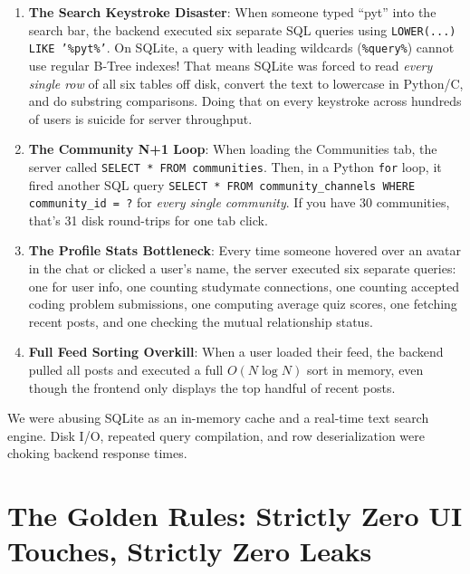 \documentclass[11pt,a4paper]{article}
\begin{document}
\begin{enumerate}
    \item \textbf{The Search Keystroke Disaster}: When someone typed ``pyt'' into the search bar, the backend executed six separate SQL queries using \texttt{LOWER(...) LIKE '\%pyt\%'}. On SQLite, a query with leading wildcards (\texttt{\%query\%}) cannot use regular B-Tree indexes! That means SQLite was forced to read \textit{every single row} of all six tables off disk, convert the text to lowercase in Python/C, and do substring comparisons. Doing that on every keystroke across hundreds of users is suicide for server throughput.
    
    \item \textbf{The Community N+1 Loop}: When loading the Communities tab, the server called \texttt{SELECT * FROM communities}. Then, in a Python \texttt{for} loop, it fired another SQL query \texttt{SELECT * FROM community_channels WHERE community_id = ?} for \textit{every single community}. If you have 30 communities, that's 31 disk round-trips for one tab click.
    
    \item \textbf{The Profile Stats Bottleneck}: Every time someone hovered over an avatar in the chat or clicked a user's name, the server executed six separate queries: one for user info, one counting studymate connections, one counting accepted coding problem submissions, one computing average quiz scores, one fetching recent posts, and one checking the mutual relationship status.
    
    \item \textbf{Full Feed Sorting Overkill}: When a user loaded their feed, the backend pulled all posts and executed a full $O(N \log N)$ sort in memory, even though the frontend only displays the top handful of recent posts.
\end{enumerate}

\begin{tcolorbox}[colback=red!5!white,colframe=red!75!black,title=\textbf{The Bottom Line}]
We were abusing SQLite as an in-memory cache and a real-time text search engine. Disk I/O, repeated query compilation, and row deserialization were choking backend response times.
\end{tcolorbox}

\section{The Golden Rules: Strictly Zero UI Touches, Strictly Zero Leaks}
\end{document}
